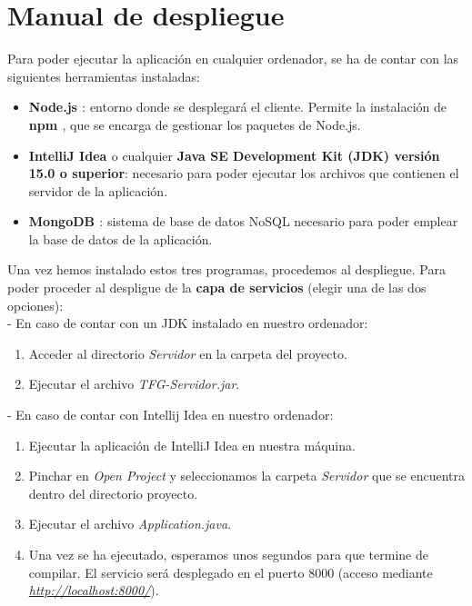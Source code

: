 \section{Manual de despliegue}

Para poder ejecutar la aplicación en cualquier ordenador, se ha de contar con las siguientes herramientas instaladas:
\begin{itemize}
\item {\bf Node.js \cite{nodejs}}: entorno donde se desplegará el cliente. Permite la instalación de {\bf npm \cite{npm}}, que se encarga de gestionar los paquetes de Node.js.
\item {\bf IntelliJ Idea \cite{intellij}} o cualquier {\bf Java SE Development Kit (JDK) \cite{jdk} versión 15.0 o superior}: necesario para poder ejecutar los archivos que contienen el servidor de la aplicación.
\item {\bf MongoDB \cite{mongodb}}: sistema de base de datos NoSQL necesario para poder emplear la base de datos de la aplicación.
\end{itemize}

Una vez hemos instalado estos tres programas, procedemos al despliegue. Para poder proceder al despligue de la {\bf capa de servicios} (elegir una de las dos opciones):
\\

- En caso de contar con un JDK instalado en nuestro ordenador:
\begin{enumerate}
\item Acceder al directorio {\it Servidor} en la carpeta del proyecto.
\item Ejecutar el archivo {\it TFG-Servidor.jar}.
\end{enumerate}

- En caso de contar con Intellij Idea en nuestro ordenador:
\begin{enumerate}
\item Ejecutar la aplicación de IntelliJ Idea en nuestra máquina.
\item Pinchar en {\it Open Project} y seleccionamos la carpeta {\it Servidor} que se encuentra dentro del directorio proyecto.
\item Ejecutar el archivo {\it Application.java}.
\item Una vez se ha ejecutado, esperamos unos segundos para que termine de compilar. El servicio será desplegado en el puerto 8000 (acceso mediante {\it \url{http://localhost:8000/}}).
\end{enumerate}

